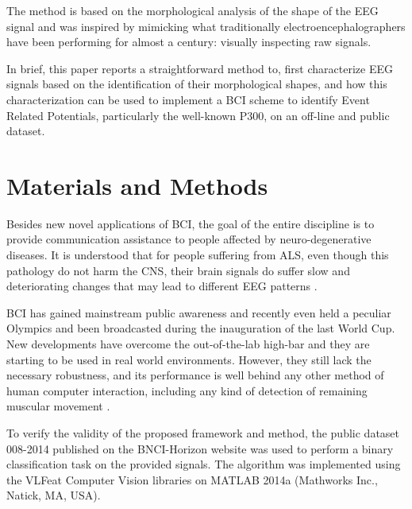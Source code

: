 \documentclass[entropy,article,submit,moreauthors,pdftex,10pt,a4paper]{mdpi}
\begin{document}
The method is based on the morphological analysis of the shape of the EEG signal\citep{Alvarado-Gonzalez2016,Yamaguchi2009} and was inspired by mimicking what traditionally electroencephalographers have been performing for almost a century: visually inspecting  raw signals.


In brief, this paper reports a straightforward method to, first characterize EEG signals based on the identification of their morphological shapes, and how this characterization can be used to implement a BCI scheme to identify Event Related Potentials, particularly the well-known P300, on an off-line and public dataset.


\section{Materials and Methods}

Besides new novel applications of BCI, the goal of the entire discipline is to provide communication assistance to people affected by neuro-degenerative diseases.  It is understood that for people suffering from ALS, even though this pathology do not harm the CNS, their brain signals do suffer slow and deteriorating changes that may lead to different EEG patterns \citep{Nijboer2009,Riener2014}.

BCI has gained mainstream public awareness and recently even held a peculiar Olympics \citep{Riener2014} and been broadcasted during the inauguration of the last World Cup.  New developments have overcome the out-of-the-lab high-bar and they are starting to be used in real world environments\citep{Huggins2016}.  However, they still lack the necessary robustness, and its performance is well behind any other method of human computer interaction, including any kind of detection of remaining muscular movement \citep{Clerc}.

To verify the validity of the proposed framework and method, the public dataset 008-2014 published on the BNCI-Horizon website \citep{Riccio2013} was used to perform a binary classification task on the provided signals.  The algorithm was implemented using the VLFeat \citep{Vedaldi2010} Computer Vision libraries on MATLAB 2014a (Mathworks Inc., Natick, MA, USA). 
\end{document}
